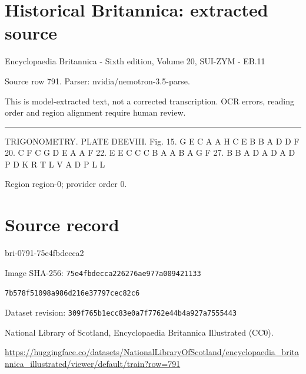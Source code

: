 \documentclass[11pt]{article}
\begin{document}
\section*{Historical Britannica: extracted source}
Encyclopaedia Britannica - Sixth edition, Volume 20, SUI-ZYM - EB.11\par
{\small Source row 791. Parser: nvidia/nemotron-3.5-parse.\par}
{\small This is model-extracted text, not a corrected transcription. OCR errors, reading order and region alignment require human review.\par}
\hrule\medskip
TRIGONOMETRY. PLATE DEEVIII.
Fig. 15. G
E
C
A
A
H
C
E
B
B
A
D
D
F
20.
C
F
C
G
D
E
A
A
F
22.
E
E
C
C
C
B
A
A
B
A
G
F
27.
B
B
A
D
A
D
A
D
P
D
K
R
T
L
V
A
D
P
L
L
\par

{\scriptsize\color{gray} Region region-0; provider order 0.\par}
\medskip
\newpage\section*{Source record}
bri-0791-75e4fbdecca2\par
Image SHA-256: \texttt{75e4fbdecca226276ae977a009421133}\par\texttt{7b578f51098a986d216e37797cec82c6}\par
Dataset revision: \texttt{309f765b1ecc83e0a7f7}\texttt{762e44b4a927a7555443}\par
National Library of Scotland, Encyclopaedia Britannica Illustrated (CC0).\par
\url{https://huggingface.co/datasets/NationalLibraryOfScotland/encyclopaedia_britannica_illustrated/viewer/default/train?row=791}
\end{document}
